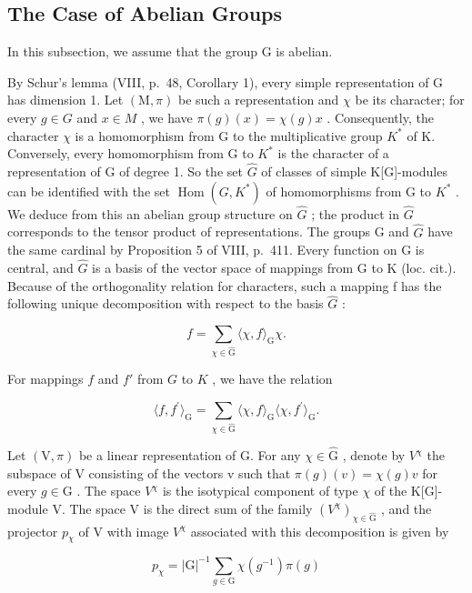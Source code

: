 \subsection{The Case of Abelian Groups}

In this subsection, we assume that the group \(\mathrm{G}\) is abelian.

By Schur's lemma (VIII, p.~48, Corollary 1), every simple representation of G has dimension 1. Let \((\mathrm{M},\pi)\) be such a representation and \(\chi\) be its character; for every \(g\in G\) and \(x\in M\) , we have \(\pi(g)(x)=\chi(g)x\) . Consequently, the character \(\chi\) is a homomorphism from G to the multiplicative group \(K^{*}\) of K. Conversely, every homomorphism from G to \(K^{*}\) is the character of a representation of G of degree 1. So the set \(\widehat{G}\) of classes of simple K{[}G{]}-modules can be identified with the set \(\operatorname{Hom}(G,K^{*})\) of homomorphisms from G to \(K^{*}\) . We deduce from this an abelian group structure on \(\widehat{G}\) ; the product in \(\widehat{G}\) corresponds to the tensor product of representations. The groups G and \(\widehat{G}\) have the same cardinal by Proposition 5 of VIII, p.~411. Every function on G is central, and \(\widehat{G}\) is a basis of the vector space of mappings from G to K (loc. cit.). Because of the orthogonality relation for characters, such a mapping f has the following unique decomposition with respect to the basis \(\widehat{G}\) :

\[
f = \sum_ {\chi \in \widehat {\mathrm{G}}} \langle \chi , f \rangle_ {\mathrm{G}} \chi .\tag{39}
\]

For mappings \(f\) and \(f'\) from \(G\) to \(K\) , we have the relation

\[
\langle f, f ^ {\prime} \rangle_ {\mathrm{G}} = \sum_ {\chi \in \widehat {\mathrm{G}}} \langle \chi , f \rangle_ {\mathrm{G}} \langle \chi , f ^ {\prime} \rangle_ {\mathrm{G}}.\tag{40}
\]

Let \((\mathrm{V},\pi)\) be a linear representation of G. For any \(\chi\in\widehat{\mathrm{G}}\) , denote by \(V^{\chi}\) the subspace of V consisting of the vectors v such that \(\pi(g)(v)=\chi(g)v\) for every \(g\in\mathrm{G}\) . The space \(V^{\chi}\) is the isotypical component of type \(\chi\) of the K{[}G{]}-module V. The space V is the direct sum of the family \((V^{\chi})_{\chi\in\widehat{\mathrm{G}}}\) , and the projector \(p_{\chi}\) of V with image \(V^{\chi}\) associated with this decomposition is given by

\[
p _ {\chi} = | \mathrm{G} | ^ {- 1} \sum_ {g \in \mathrm{G}} \chi (g ^ {- 1}) \pi (g)\tag{41}
\]

